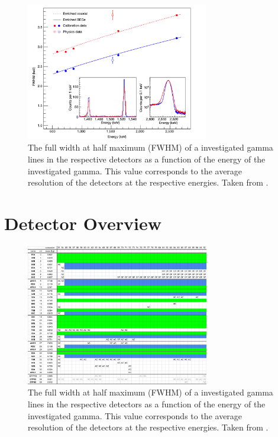 \begin{figure}
	\centering
	\ifmakefigures%
	\includegraphics[width=80mm]{./Bilder/Aufloesung.png}
	\fi%
	\caption{
		The full width at half maximum (FWHM) of a investigated gamma lines in the respective detectors as a function of the energy of the investigated gamma.
		This value corresponds to the average resolution of the detectors at the respective energies.
		Taken from \cite{agostini_background_2017}.
	}
	\label{fig:Aufloesung}
\end{figure}


\chapter{Detector Overview}

\begin{figure}
	\centering
	\ifmakefigures%
	\includegraphics[width=80mm]{./Bilder/runOverview.png}
	\fi%
	\caption{
		The full width at half maximum (FWHM) of a investigated gamma lines in the respective detectors as a function of the energy of the investigated gamma.
		This value corresponds to the average resolution of the detectors at the respective energies.
		Taken from \cite{agostini_background_2017}.
	}
	\label{fig:Aufloesung}
\end{figure}

